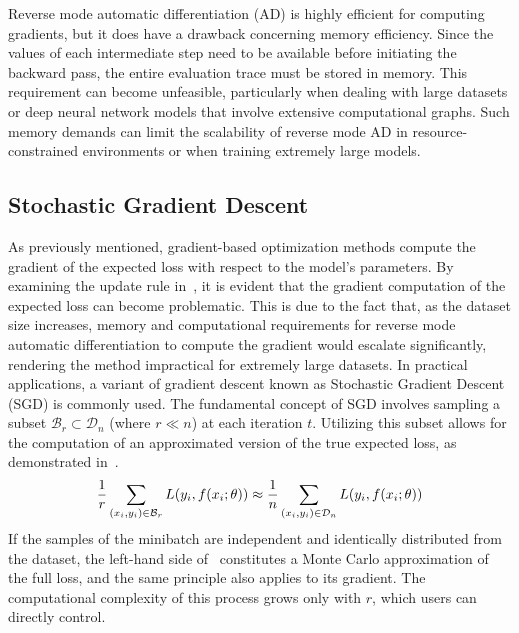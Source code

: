 Reverse mode automatic differentiation (AD) is highly efficient for computing
gradients, but it does have a drawback concerning memory efficiency. Since the
values of each intermediate step need to be available before initiating the
backward pass, the entire evaluation trace must be stored in memory. This
requirement can become unfeasible, particularly when dealing with large
datasets or deep neural network models that involve extensive computational
graphs. Such memory demands can limit the scalability of reverse mode AD in
resource-constrained environments or when training extremely large models.
\subsection{Stochastic Gradient Descent}
As previously mentioned, gradient-based optimization methods compute the
gradient of the expected loss with respect to the model's parameters. By
examining the update rule in~, it is evident that the
gradient computation of the expected loss can become problematic. This is due
to the fact that, as the dataset size increases, memory and computational
requirements for reverse mode automatic differentiation to compute the gradient
would escalate significantly, rendering the method impractical for extremely
large datasets. In practical applications, a variant of gradient descent known
as Stochastic Gradient Descent (SGD) is commonly used. The fundamental concept
of SGD involves sampling a subset $\mathcal{B}_r \subset \mathcal{D}_n$ (where
$r \ll n$) at each iteration $t$. Utilizing this subset allows for the
computation of an approximated version of the true expected loss, as
demonstrated in~.
\begin{equation}
    \labeq{2_12}
    \frac{1}{r} \sum_{(x_i, y_i) \in \mathcal{B}_r} L(y_i, f(x_i; \theta)) \approx 
    \frac{1}{n} \sum_{(x_i, y_i) \in \mathcal{D}_n} L(y_i, f(x_i; \theta)) 
\end{equation}
If the samples of the minibatch are independent and identically distributed
from the dataset, the left-hand side of~ constitutes a
Monte Carlo approximation of the full loss, and the same principle also applies
to its gradient. The computational complexity of this process grows only with
$r$, which users can directly control.

